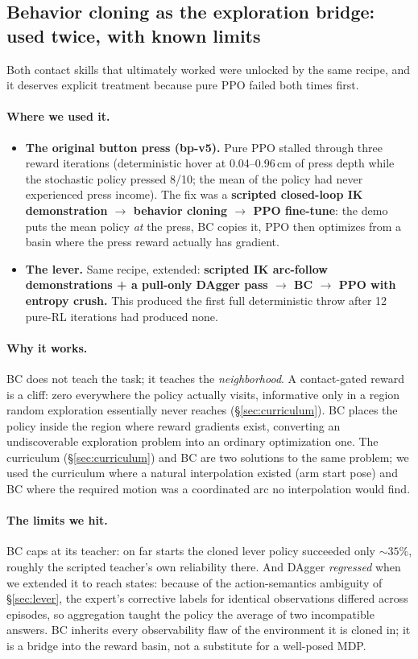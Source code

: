 \documentclass[11pt]{article}
\begin{document}
\subsection{Behavior cloning as the exploration bridge: used twice, with known limits}
\label{sec:bc}

Both contact skills that ultimately worked were unlocked by the same recipe, and it deserves explicit treatment because pure PPO failed both times first.

\paragraph{Where we used it.}
\begin{itemize}[nosep]
  \item \textbf{The original button press (bp-v5).} Pure PPO stalled through three reward iterations (deterministic hover at 0.04--0.96\,cm of press depth while the stochastic policy pressed 8/10; the mean of the policy had never experienced press income). The fix was a \textbf{scripted closed-loop IK demonstration $\to$ behavior cloning $\to$ PPO fine-tune}: the demo puts the mean policy \emph{at} the press, BC copies it, PPO then optimizes from a basin where the press reward actually has gradient.
  \item \textbf{The lever.} Same recipe, extended: \textbf{scripted IK arc-follow demonstrations + a pull-only DAgger pass $\to$ BC $\to$ PPO with entropy crush.} This produced the first full deterministic throw after 12 pure-RL iterations had produced none.
\end{itemize}

\paragraph{Why it works.} BC does not teach the task; it teaches the \emph{neighborhood}. A contact-gated reward is a cliff: zero everywhere the policy actually visits, informative only in a region random exploration essentially never reaches (\S\ref{sec:curriculum}). BC places the policy inside the region where reward gradients exist, converting an undiscoverable exploration problem into an ordinary optimization one. The curriculum (\S\ref{sec:curriculum}) and BC are two solutions to the same problem; we used the curriculum where a natural interpolation existed (arm start pose) and BC where the required motion was a coordinated arc no interpolation would find.

\paragraph{The limits we hit.} BC caps at its teacher: on far starts the cloned lever policy succeeded only ${\sim}35\%$, roughly the scripted teacher's own reliability there. And DAgger \emph{regressed} when we extended it to reach states: because of the action-semantics ambiguity of \S\ref{sec:lever}, the expert's corrective labels for identical observations differed across episodes, so aggregation taught the policy the average of two incompatible answers. BC inherits every observability flaw of the environment it is cloned in; it is a bridge into the reward basin, not a substitute for a well-posed MDP.
\end{document}
